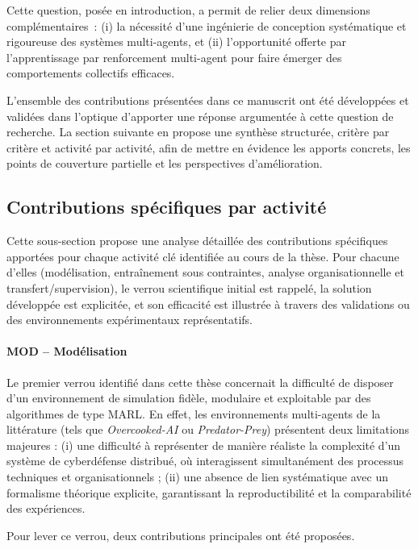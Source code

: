 \noindent
Cette question, posée en introduction, a permit de relier deux dimensions complémentaires~:
(i) la nécessité d’une ingénierie de conception systématique et rigoureuse des systèmes multi-agents, et
(ii) l’opportunité offerte par l’apprentissage par renforcement multi-agent pour faire émerger des comportements collectifs efficaces.

L’ensemble des contributions présentées dans ce manuscrit ont été développées et validées dans l’optique d’apporter une réponse argumentée à cette question de recherche. La section suivante en propose une synthèse structurée, critère par critère et activité par activité, afin de mettre en évidence les apports concrets, les points de couverture partielle et les perspectives d’amélioration.


\subsection*{Contributions spécifiques par activité}

Cette sous-section propose une analyse détaillée des contributions spécifiques apportées pour chaque activité clé identifiée au cours de la thèse. Pour chacune d’elles (modélisation, entraînement sous contraintes, analyse organisationnelle et transfert/supervision), le verrou scientifique initial est rappelé, la solution développée est explicitée, et son efficacité est illustrée à travers des validations ou des environnements expérimentaux représentatifs.

\paragraph{MOD – Modélisation}

Le premier verrou identifié dans cette thèse concernait la difficulté de disposer d’un environnement de simulation fidèle, modulaire et exploitable par des algorithmes de type MARL.
En effet, les environnements multi-agents de la littérature (tels que \textit{Overcooked-AI} ou \textit{Predator-Prey}) présentent deux limitations majeures :
(i) une difficulté à représenter de manière réaliste la complexité d’un système de cyberdéfense distribué, où interagissent simultanément des processus techniques et organisationnels ;
(ii) une absence de lien systématique avec un formalisme théorique explicite, garantissant la reproductibilité et la comparabilité des expériences.

Pour lever ce verrou, deux contributions principales ont été proposées.

